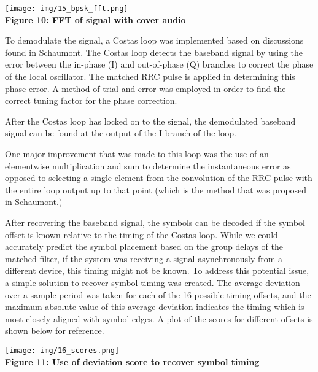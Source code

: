 \documentclass{article}
\begin{document}
\begin{center}
  \texttt{[image: img/15\_bpsk\_fft.png]} \\
  \textbf{Figure 10: FFT of signal with cover audio}
\end{center}

To demodulate the signal, a Costas loop was implemented based on discussions
found in Schaumont. The Costas loop detects the baseband signal by using the
error between the in-phase (I) and out-of-phase (Q) branches to correct the
phase of the local oscillator. The matched RRC pulse is applied in determining this
phase error. A method of trial and error was employed in order
to find the correct tuning factor for the phase correction.

\vspace{6pt}

After the Costas loop has locked on to the signal, the demodulated baseband signal
can be found at the output of the I branch of the loop. 

\vspace{6pt}

One major improvement that was made to this loop was the use of an elementwise
multiplication and sum to determine the instantaneous error as opposed to selecting
a single element from the convolution of the RRC pulse with the entire loop output
up to that point (which is the method that was proposed in Schaumont.)

\vspace{6pt}

After recovering the baseband signal, the symbols can be decoded if the symbol
offset is known relative to the timing of the Costas loop. While we could
accurately predict the symbol placement based on the group delays of the matched
filter, if the system was receiving a signal asynchronously from a different
device, this timing might not be known. To address this potential issue, a simple
solution to recover symbol timing was created. The average deviation over a sample
period was taken for each of the 16 possible timing offsets, and the maximum
absolute value of this average deviation indicates the timing which is most
closely aligned with symbol edges. A plot of the scores for different offsets
is shown below for reference.


\begin{center}
  \texttt{[image: img/16\_scores.png]} \\
  \textbf{Figure 11: Use of deviation score to recover symbol timing}
\end{center}
\end{document}
